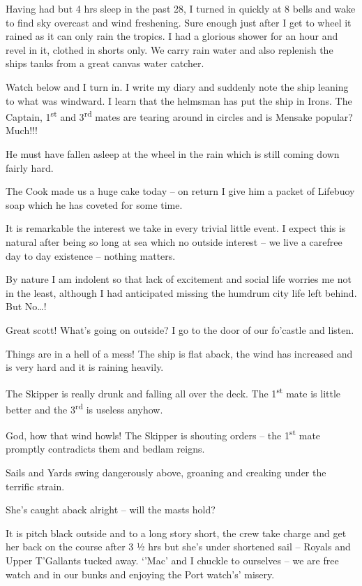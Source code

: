 \documentclass[
  11pt,
  msmallroyalvopaper
]{memoir}
\begin{document}
Having had but 4 hrs sleep in the past 28, I turned in quickly at 8
bells and wake to find sky overcast and wind freshening. Sure enough
just after I get to wheel it rained as it can only rain the tropics. I
had a glorious shower for an hour and revel in it, clothed in shorts
only. We carry rain water and also replenish the ships tanks from a
great canvas water catcher.

Watch below and I turn in. I write my diary and suddenly note the ship
leaning to what was windward. I learn that the helmsman has put the ship
in Irons. The Captain, 1\textsuperscript{st} and 3\textsuperscript{rd}
mates are tearing around in circles and is Mensake popular? Much!!!

He must have fallen asleep at the wheel in the rain which is still
coming down fairly hard.

The Cook made us a huge cake today -- on return I give him a packet of
Lifebuoy soap which he has coveted for some time.

It is remarkable the interest we take in every trivial little event. I
expect this is natural after being so long at sea which no outside
interest -- we live a carefree day to day existence -- nothing matters.

By nature I am indolent so that lack of excitement and social life
worries me not in the least, although I had anticipated missing the
humdrum city life left behind. But No\ldots!

Great scott! What's going on outside? I go to the door of our fo'castle
and listen.

Things are in a hell of a mess! The ship is flat aback, the wind has
increased and is very hard and it is raining heavily.

The Skipper is really drunk and falling all over the deck. The
1\textsuperscript{st} mate is little better and the
3\textsuperscript{rd} is useless anyhow.

God, how that wind howls! The Skipper is shouting orders -- the
1\textsuperscript{st} mate promptly contradicts them and bedlam reigns.

Sails and Yards swing dangerously above, groaning and creaking under the
terrific strain.

She's caught aback alright -- will the masts hold?

It is pitch black outside and to a long story short, the crew take
charge and get her back on the course after 3 ½ hrs but she's under
shortened sail -- Royals and Upper T'Gallants tucked away. `'Mac' and I
chuckle to ourselves -- we are free watch and in our bunks and enjoying
the Port watch's' misery.
\end{document}
